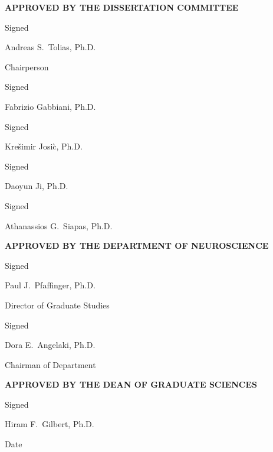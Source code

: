 \documentclass[12pt,letterpaper,titlepage,twoside,openright]{report}
\begin{document}
\begin{center}
\textbf{\uppercase{\large Approved by the dissertation committee}}

\vspace{9pt}
Signed \underline{\hspace{3in}}

\vspace{-9pt}
Andreas S.\ Tolias, Ph.D.

\vspace{-9pt}
Chairperson


Signed \underline{\hspace{3in}}

\vspace{-9pt}
Fabrizio Gabbiani, Ph.D.


Signed \underline{\hspace{3in}}

\vspace{-9pt}
Kre\v{s}imir Josi\`{c}, Ph.D.

Signed \underline{\hspace{3in}}

\vspace{-9pt}
Daoyun Ji, Ph.D.

Signed \underline{\hspace{3in}}

\vspace{-9pt}
Athanassios G.\ Siapas, Ph.D.


\vspace{24pt}
\textbf{\uppercase{\large Approved by the department of neuroscience}}

\vspace{9pt}
Signed \underline{\hspace{3in}}

\vspace{-9pt}
Paul J.\ Pfaffinger, Ph.D.

\vspace{-9pt}
Director of Graduate Studies

Signed \underline{\hspace{3in}}

\vspace{-9pt}
Dora E.\ Angelaki, Ph.D.

\vspace{-9pt}
Chairman of Department

\vspace{24pt}
\textbf{\uppercase{\large Approved by the dean of graduate sciences}}

\vspace{9pt}
Signed \underline{\hspace{3in}}

\vspace{-9pt}
Hiram F.\ Gilbert, Ph.D.

\vspace{6pt}
Date \underline{\hspace{3in}}

\end{center}
\end{document}
